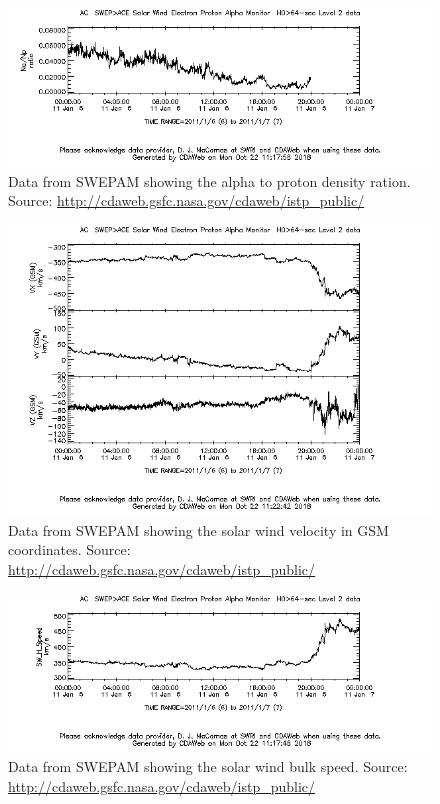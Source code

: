 \documentclass[norsk,a4paper,11pt]{article}
\begin{document}
\begin{multicols}{2}
\begin{figure}[H]
	\includegraphics[scale=0.4]{Figures/ACE_Na_Np.png}
	\centering
	\caption{Data from SWEPAM showing the alpha to proton density ration. Source: \url{http://cdaweb.gsfc.nasa.gov/cdaweb/istp_public/}}
	\label{fig:ACE_na_np}
\end{figure}

\begin{figure}[H]
	\includegraphics[scale=0.4]{Figures/ACE_SE_velocityGSM.png}
	\centering
	\caption{Data from SWEPAM showing the solar wind velocity in GSM coordinates. Source: \url{http://cdaweb.gsfc.nasa.gov/cdaweb/istp_public/}}
	\label{fig:SWvelGSM}
\end{figure}

\begin{figure}[H]
	\includegraphics[scale=0.4]{Figures/ACE_SW_H_Speed.png}
	\centering
	\caption{Data from SWEPAM showing the solar wind bulk speed. Source: \url{http://cdaweb.gsfc.nasa.gov/cdaweb/istp_public/}}
	\label{fig:ACE_bulk}
\end{figure}


\end{multicols}
\end{document}
